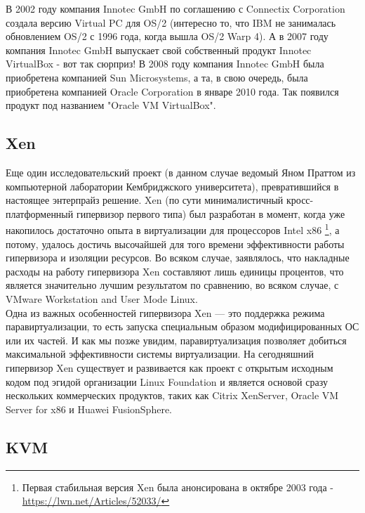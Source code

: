 \documentclass[14pt, a4paper]{article}
\begin{document}
В 2002 году компания Innotec GmbH по соглашению с Connectix Corporation создала
версию Virtual PC для OS/2 (интересно то, что IBM не занималась обновлением OS/2 с
1996 года, когда вышла OS/2 Warp 4). А в 2007 году компания Innotec GmbH выпускает
свой собственный продукт Innotec VirtualBox - вот так сюрприз!
В 2008 году компания Innotec GmbH была приобретена компанией Sun Microsystems, а
та, в свою очередь, была приобретена компанией Oracle Corporation в январе 2010
года. Так появился продукт под названием "Oracle VM VirtualBox".\\

\subsection*{Xen}

Еще один исследовательский проект (в данном случае ведомый Яном Праттом из
компьютерной лаборатории Кембриджского университета), превратившийся в
настоящее энтерпрайз решение. Xen (по сути минималистичный
кросс-платформенный гипервизор первого типа) был разработан в момент, когда уже
накопилось достаточно опыта в виртуализации для процессоров Intel x86 \footnote{Первая стабильная версия Xen была анонсирована в октябре 2003 года -
\href{https://lwn.net/Articles/52033/}{https://lwn.net/Articles/52033/}}, а потому,
удалось достичь высочайшей для того времени эффективности работы гипервизора и
изоляции ресурсов. Во всяком случае, заявлялось, что накладные расходы на работу
гипервизора Xen составляют лишь единицы процентов, что является значительно
лучшим результатом по сравнению, во всяком случае, с VMware Workstation and User
Mode Linux.\\


Одна из важных особенностей гипервизора Xen — это поддержка режима
паравиртуализации, то есть запуска специальным образом модифицированных ОС
или их частей. И как мы позже увидим, паравиртуализация позволяет добиться
максимальной эффективности системы виртуализации.
На сегодняшний гипервизор Xen существует и развивается как проект с открытым
исходным кодом под эгидой организации Linux Foundation и является основой сразу
нескольких коммерческих продуктов, таких как Citrix XenServer, Oracle VM Server for
x86 и Huawei FusionSphere.

\subsection*{KVM}
\end{document}
